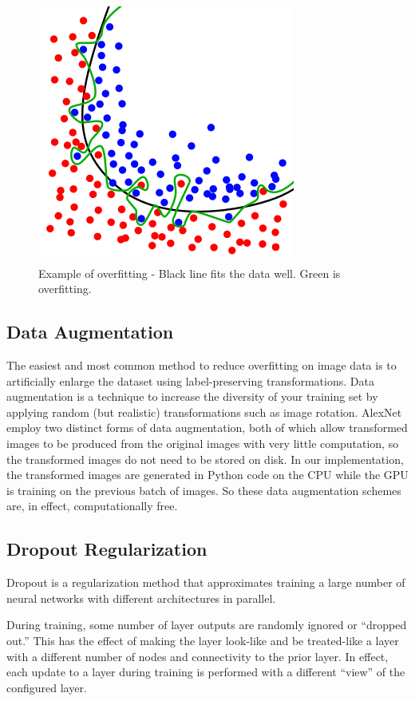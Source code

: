 \documentclass[11pt]{report}
\begin{document}
\begin{figure}[!h]
	\includegraphics[scale=0.3]{overfit.png}
	\centering 
	\caption{Example of overfitting - Black line fits the data well. Green is overfitting.}
	\label{overfit}
\end{figure}

\subsection{Data Augmentation}
The easiest and most common method to reduce overfitting on image data is to artificially enlarge the dataset using label-preserving transformations. Data augmentation is a technique to increase the diversity of your training set by applying random (but realistic) transformations such as image rotation. AlexNet employ two distinct forms of data augmentation, both of which allow transformed images to be produced from the original images with very little computation, so the transformed images do not need to be stored on disk. In our implementation, the transformed images are generated in Python code on the CPU while the GPU is training on the previous batch of images. So these data augmentation schemes are, in effect, computationally free.

\subsection{Dropout Regularization}
Dropout is a regularization method that approximates training a large number of neural networks with different architectures in parallel.

During training, some number of layer outputs are randomly ignored or “dropped out.” This has the effect of making the layer look-like and be treated-like a layer with a different number of nodes and connectivity to the prior layer. In effect, each update to a layer during training is performed with a different “view” of the configured layer.
\end{document}
